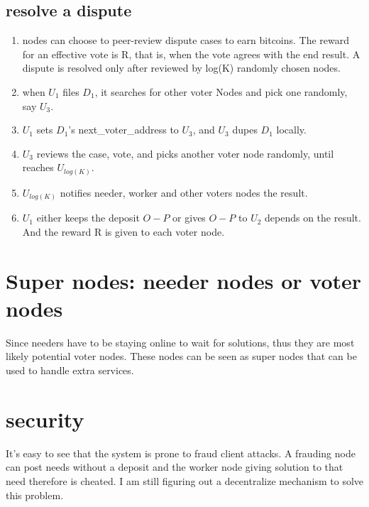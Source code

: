 \documentclass[12pt]{article}
\begin{document}
\subsection{resolve a dispute}
\begin{enumerate}
	\item nodes can choose to peer-review dispute cases to earn bitcoins. The reward for an effective vote is R, that is, when the vote agrees with the end result. A dispute is resolved only after reviewed by log(K) randomly chosen nodes.
	\item when $U_1$ files $D_1$, it searches for other voter Nodes and pick one randomly, say $U_3$. 
	\item $U_1$ sets $D_1$'s next\_voter\_address to $U_3$, and $U_3$ dupes $D_1$ locally. 
	\item $U_3$ reviews the case, vote, and picks another voter node randomly, until reaches $U_{log(K)}$.
	\item $U_{log(K)}$ notifies needer, worker and other voters nodes the result.
	\item $U_1$ either keeps the deposit $O-P$ or gives $O-P$ to $U_2$ depends on the result. And the reward R is given to each voter node.
\end{enumerate}

\section{Super nodes: needer nodes or voter nodes}
Since needers have to be staying online to wait for solutions, thus they are most likely potential voter nodes. These nodes can be seen as super nodes that can be used to handle extra services.

\section{security}
It's easy to see that the system is prone to fraud client attacks. A frauding node can post needs without a deposit and the worker node giving solution to that need therefore is cheated. I am still figuring out a decentralize mechanism to solve this problem.

\begin{thebibliography}{9}
\end{thebibliography}

	
\end{document}
